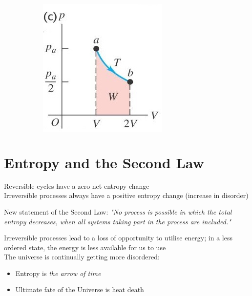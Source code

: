 \documentclass[a4paper, 11pt, fleqn, normalem]{report}
\begin{document}
\begin{figure}[H]
\begin{subfigure}{0.3\textwidth}
		\includegraphics[width=\textwidth]{Entropy2.jpg}
	\end{subfigure}
\end{figure}

\section{Entropy and the Second Law}
Reversible cycles have a zero net entropy change \\
Irreversible processes always have a positive entropy change (increase in disorder)

New statement of the Second Law: \emph{"No process is possible in which the total entropy decreases, when all systems taking part in the process are included."}

Irreversible processes lead to a loss of opportunity to utilise energy; in a less ordered state, the energy is less available for us to use \\
The universe is continually getting more disordered:
\begin{itemize}
	\item Entropy is \emph{the arrow of time}
	\item Ultimate fate of the Universe is heat death
\end{itemize}
\end{document}
